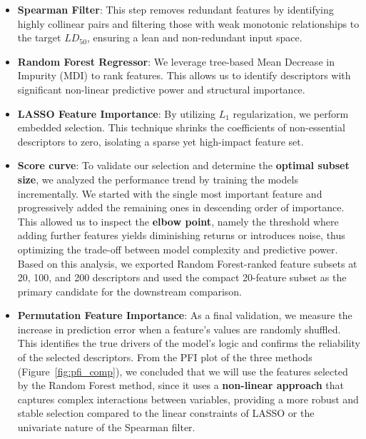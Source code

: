 \documentclass[10pt,a4paper,twocolumn]{article}
\begin{document}
\begin{itemize}
    \item \textbf{Spearman Filter}: This step removes redundant features by
    identifying highly collinear pairs and filtering those with weak monotonic
    relationships to the target $LD_{50}$, ensuring a lean and non-redundant
    input space.

    \item \textbf{Random Forest Regressor}: We leverage tree-based Mean Decrease
    in Impurity (MDI) to rank features. This allows us to identify descriptors
    with significant non-linear predictive power and structural importance.

    \item \textbf{LASSO Feature Importance}: By utilizing $L_1$ regularization,
    we perform embedded selection. This technique shrinks the coefficients of
    non-essential descriptors to zero, isolating a sparse yet high-impact
    feature set.

    \item \textbf{Score curve}: To validate our selection and determine the
    \textbf{optimal subset size}, we analyzed the performance trend by training
    the models incrementally. We started with the single most important feature
    and progressively added the remaining ones in descending order of
    importance. This allowed us to inspect the \textbf{elbow point}, namely the
    threshold where adding further features yields diminishing returns or
    introduces noise, thus optimizing the trade-off between model complexity and
    predictive power. Based on this analysis, we exported Random Forest-ranked
    feature subsets at 20, 100, and 200 descriptors and used the compact
    20-feature subset as the primary candidate for the downstream comparison.

    \item \textbf{Permutation Feature Importance}: As a final validation, we
    measure the increase in prediction error when a feature's values are
    randomly shuffled. This identifies the true drivers of the model's logic and
    confirms the reliability of the selected descriptors. From the PFI plot of
    the three methods (Figure~\ref{fig:pfi_comp}), we concluded that we will use
    the features selected by the Random Forest method, since it uses a
    \textbf{non-linear approach} that captures complex interactions between
    variables, providing a more robust and stable selection compared to the
    linear constraints of LASSO or the univariate nature of the Spearman filter.
\end{itemize}
\end{document}
